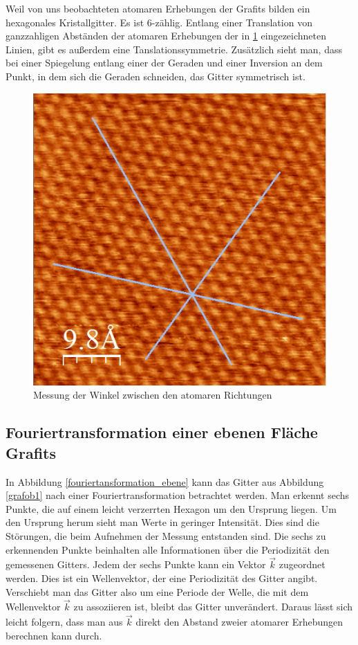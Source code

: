 \documentclass[10pt,a4paper]{article}
\begin{document}
 Weil von uns beobachteten atomaren Erhebungen der Grafits bilden ein hexagonales Kristallgitter. Es ist 6-zählig. Entlang einer Translation von ganzzahligen Abständen der atomaren Erhebungen der in \ref{Messungerh6} eingezeichneten Linien, gibt es außerdem eine Tanslationssymmetrie. Zusätzlich sieht man, dass bei einer Spiegelung entlang einer der Geraden und einer Inversion an dem Punkt, in dem sich die Geraden schneiden, das Gitter symmetrisch ist.

\begin{figure}[h]
	\centering
	
	\includegraphics[scale = 0.7]{Winkelmessung_kristall.png}
	
	\caption{Messung der Winkel zwischen den atomaren Richtungen}
	\label{Messungerh6}
\end{figure}

\subsection{Fouriertransformation einer ebenen Fläche Grafits}

In Abbildung \ref{fouriertansformation_ebene} kann das Gitter aus Abbildung \ref{grafob1} nach einer Fouriertransformation betrachtet werden. Man erkennt sechs Punkte, die auf einem leicht verzerrten Hexagon um den Ursprung liegen. Um den Ursprung herum sieht man Werte in geringer Intensität. Dies sind die Störungen, die beim Aufnehmen der Messung entstanden sind. Die sechs zu erkennenden Punkte beinhalten alle Informationen über die Periodizität den gemessenen Gitters. Jedem der sechs Punkte kann ein Vektor $\vec{k}$ zugeordnet werden. Dies ist ein Wellenvektor, der eine Periodizität des Gitter angibt. Verschiebt man das Gitter also um eine Periode der Welle, die mit dem Wellenvektor $\vec{k}$ zu assoziieren ist, bleibt das Gitter unverändert. Daraus lässt sich leicht folgern, dass man aus $\vec{k}$ direkt den Abstand zweier atomarer Erhebungen berechnen kann durch.
\end{document}
